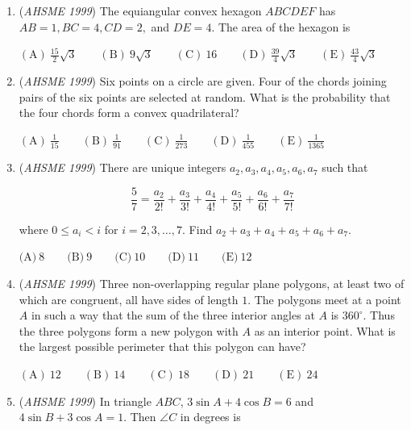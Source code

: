 \begin{enumerate}
 $\mathrm{(A) \ } 7 \qquad \mathrm{(B) \ } 8 \qquad \mathrm{(C) \ } 10 \qquad \mathrm{(D) \ } 13\qquad \mathrm{(E) \ } 18$


	\item (\textit{AHSME 1999}) The equiangular convex hexagon $ABCDEF$ has $AB = 1, BC = 4, CD = 2,$ and $DE = 4.$ The area of the hexagon is 


 $\mathrm{(A) \ } \frac {15}2\sqrt{3} \qquad \mathrm{(B) \ }9\sqrt{3} \qquad \mathrm{(C) \ }16 \qquad \mathrm{(D) \ }\frac{39}4\sqrt{3} \qquad \mathrm{(E) \ } \frac{43}4\sqrt{3}$


	\item (\textit{AHSME 1999}) Six points on a circle are given. Four of the chords joining pairs of the six points are selected at random. What is the probability that the four chords form a convex quadrilateral?


 $\mathrm{(A) \ } \frac 1{15} \qquad \mathrm{(B) \ } \frac 1{91} \qquad \mathrm{(C) \ } \frac 1{273} \qquad \mathrm{(D) \ } \frac 1{455} \qquad \mathrm{(E) \ } \frac 1{1365}$


	\item (\textit{AHSME 1999}) There are unique integers $a_{2},a_{3},a_{4},a_{5},a_{6},a_{7}$ such that


 
 \[\frac {5}{7} = \frac {a_{2}}{2!} + \frac {a_{3}}{3!} + \frac {a_{4}}{4!} + \frac {a_{5}}{5!} + \frac {a_{6}}{6!} + \frac {a_{7}}{7!}\]


 where $0\leq a_{i} < i$ for $i = 2,3,\ldots,7$.  Find $a_{2} + a_{3} + a_{4} + a_{5} + a_{6} + a_{7}$.


 $\textrm{(A)} \ 8 \qquad \textrm{(B)} \ 9 \qquad \textrm{(C)} \ 10 \qquad \textrm{(D)} \ 11 \qquad \textrm{(E)} \ 12$


	\item (\textit{AHSME 1999}) Three non-overlapping regular plane polygons, at least two of which are congruent, all have sides of length $1$. The polygons meet at a point $A$ in such a way that the sum of the three interior angles at $A$ is $360^{\circ}$. Thus the three polygons form a new polygon with $A$ as an interior point. What is the largest possible perimeter that this polygon can have? 


 $\mathrm{(A) \ }12 \qquad \mathrm{(B) \ }14 \qquad \mathrm{(C) \ }18 \qquad \mathrm{(D) \ }21 \qquad \mathrm{(E) \ } 24$


	\item (\textit{AHSME 1999}) In triangle $ABC$, $3 \sin A + 4 \cos B = 6$ and $4 \sin B + 3 \cos A = 1$. Then $\angle C$ in degrees is 



\end{enumerate}
